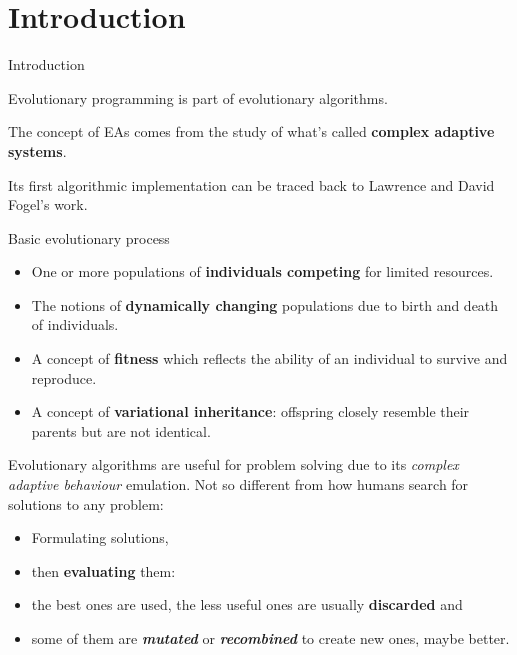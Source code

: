 \justifying

  \section*{Introduction}
  \begin{frame}{Introduction}
    \begin{blur}

      Evolutionary programming is part of evolutionary algorithms.

      The concept of EAs comes from the study of what's called
      \textbf{complex adaptive systems}. 

      Its first algorithmic implementation can be traced back to
      Lawrence and David Fogel's work.

    \end{blur}
  \end{frame}


  \begin{frame}{Basic evolutionary process}
  \begin{blur}
    \begin{itemize}
      \item One or more populations of \textbf{individuals competing} for
      limited resources.
      \item The notions of \textbf{dynamically changing} populations due
      to birth and death of individuals.
      \item A concept of \textbf{fitness} which reflects the ability of
      an individual to survive and reproduce.
      \item A concept of \textbf{variational inheritance}: offspring
      closely resemble their parents but are not identical.
    \end{itemize}
  \end{blur}
  \end{frame}

  \begin{frame}{}
  \begin{blur}
    Evolutionary algorithms are useful for problem solving due to its
    \textit{complex adaptive behaviour} emulation. Not so different from
    how humans search for solutions to any problem:

    \begin{itemize}
      \item Formulating solutions,
      \item then \textbf{evaluating} them:
      \item the best ones are used, the less useful ones are usually
      \textbf{discarded} and
      \item some of them are \textbf{\itshape mutated} or
      \textbf{\itshape recombined} to create new ones, maybe better.
    \end{itemize}
  \end{blur}
  \end{frame}

